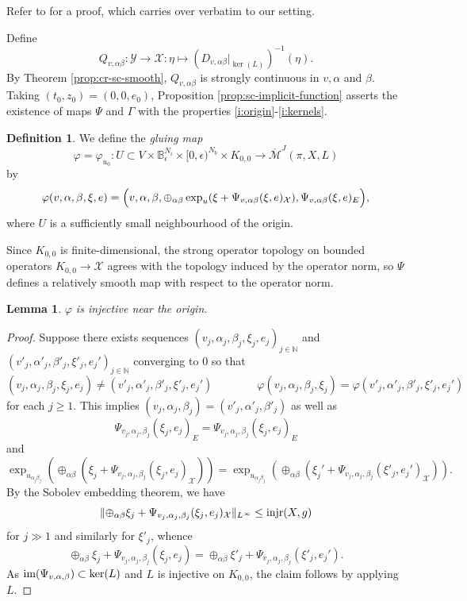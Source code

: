 \documentclass[11pt,psamsfonts, oneside, reqno]{amsart}
\newcommand{\sub}{\subset}%
\newcommand{\inv}{^{-1}}
\newcommand{\norm}[1]{\lVert#1\rVert}
\newcommand{\cl}{\colon}
\newcommand{\lbr}[1]{\Bigl(#1\Bigr)}
\newcommand{\jN}{_{j\in \bN}}
\newcommand{\im}{\normalfont\text{im}}
\newcommand{\Mbar}{\overline{\mathcal M}}
\newcommand{\bB}{\mathbb{B}}
\newcommand{\bN}{\mathbb{N}}
\newcommand{\cX}{\mathcal{X}}
\newcommand{\cY}{\mathcal{Y}}
\newtheorem{lemma}[theorem]{Lemma}
\theoremstyle{definition}
\newtheorem{definition}[theorem]{Definition}
\theoremstyle{remark}
\numberwithin{equation}{section}
\begin{document}
\noindent
Refer to \cite[Lemma~4.10]{Swa21} for a proof, which carries over verbatim to our setting.\par

Define 
\begin{equation}\label{eq:right-inverse} Q_{v,\alpha\beta}\cl \cY\to \cX : \eta \mapsto (D_{v,\alpha\beta}|_{\ker(L)})\inv(\eta). \end{equation}
By Theorem \ref{prop:cr-sc-smooth}, $Q_{v,\alpha\beta}$ is strongly continuous in $v, \alpha$ and $\beta$. Taking $(t_0,z_0) = (0,0,e_0)$, Proposition \ref{prop:sc-implicit-function} asserts the existence of maps $\Psi$ and $\Gamma$ with the properties \eqref{i:origin}-\eqref{i:kernels}.

\begin{definition}\label{de:gluing-amp} 
	We define the \emph{gluing map} 
	$$\varphi = \varphi_{u_0} \cl U\sub V\times \bB_{\epsilon}^{N_i}\times [0,\epsilon)^{N_b} \times K_{0,0}\to \Mbar^J(\pi,X,L)$$\noindent
	by 
	$$\varphi(v,\alpha,\beta,\xi,e) = \lbr{v,\alpha,\beta,\oplus_{\alpha\beta}\exp_{ u}(\xi+\Psi_{v,\alpha\beta}(\xi,e)_\cX),\Psi_{v,\alpha\beta}(\xi,e)_E},$$\noindent
	where $U$ is a sufficiently small neighbourhood of the origin. 
\end{definition}


\noindent
Since $K_{0,0}$ is finite-dimensional, the strong operator topology on bounded operators $K_{0,0} \to \cX$ agrees with the topology induced by the operator norm, so $\Psi$ defines a relatively smooth map with respect to the operator norm. 

\begin{lemma}\label{lem:gluing-injective} $\varphi$ is injective near the origin.
\end{lemma}

\begin{proof} Suppose there exists sequences $(v_j,\alpha_j,\beta_j,\xi_j,e_j)\jN$ and $(v'_j,\alpha'_j,\beta'_j,\xi'_j,e_j')\jN$ converging to $0$ so that 
	$$(v_j,\alpha_j,\beta_j,\xi_j,e_j)\neq (v'_j,\alpha'_j,\beta'_j,\xi'_j,e_j')\qquad \qquad \varphi(v_j,\alpha_j,\beta_j,\xi_j) = \varphi(v'_j,\alpha'_j,\beta'_j,\xi'_j,e_j')$$\noindent 
	for each $j\geq 1$. This implies $(v_j,\alpha_j,\beta_j) = (v'_j,\alpha'_j,\beta'_j)$ as well as  
	$$\Psi_{v_j,\alpha_j,\beta_j}(\xi_j,e_j)_E = \Psi_{v_j,\alpha_j,\beta_j}(\xi_j,e_j)_E$$\noindent
	 and
	$$\exp_{u_{\alpha_j\beta_j}}(\oplus_{\alpha\beta}(\xi_j+\Psi_{v_j,\alpha_j,\beta_j}(\xi_j,e_j)_\cX)) = \exp_{u_{\alpha_j\beta_j}}(\oplus_{\alpha\beta}(\xi_j'+\Psi_{v_j,\alpha_j,\beta_j}(\xi'_j,e_j')_\cX)).$$\noindent
	 By the Sobolev embedding theorem, we have $$\norm{\oplus_{\alpha\beta}\xi_j+\Psi_{v_j,\alpha_j,\beta_j}(\xi_j,e_j)_\cX}_{L^\infty} \leq\normalfont\text{injr}(X,g)$$ for $j \gg 1$ and similarly for $\xi'_j$, whence
	 $$\oplus_{\alpha\beta}\xi_j+\Psi_{v_j,\alpha_j,\beta_j}(\xi_j,e_j) =\oplus_{\alpha\beta}\xi'_j+ \Psi_{v_j,\alpha_j,\beta_j}(\xi'_j,e_j').$$\noindent
	 As $\im(\Psi_{v,\alpha,\beta})\sub \ker(L)$ and $L$ is injective on $K_{0,0}$, the claim follows by applying $L$.
\end{proof}
\end{document}
